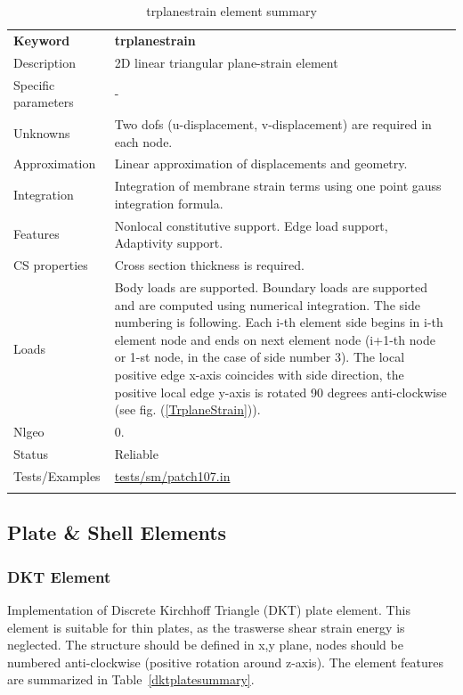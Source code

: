 \documentclass[a4paper]{article}
\newcommand{\param}[1]{\texttt{#1}} %
\newcommand{\templabel}{}%
\newcommand{\tempcaption}{}%
\newcounter{nelpar}
\newenvironment{elementsummary}[5]{%
  \gdef\tempcaption{#4}%
  \gdef\templabel{#5}%
  \setcounter{nelpar}{0}%
  \begin{center} %
    \begin{table}[!htb] %
      \begin{tabular}{|l|p{9cm}|}\hline %
        {\bf Keyword} & \bf{#1}\\ %
        {Description} & {#2}\\ %
        {Specific parameters} & {#3}\\ \hline %
}{
  \\ \hline %
      \end{tabular}%
      \caption{\tempcaption}%
      \label{\templabel}%
    \end{table}%
  \end{center}%
}
\newcommand{\elementParam}[1]{%
  \ifthenelse{\value{nelpar}>0} %
             {&{#1}}%
             {\setcounter{nelpar}{1}Parameters&{#1}}%
             \\%
}
\newcommand{\elementDescription}[2]{{#1} & {#2}\\}
\begin{document}
\begin{elementsummary}{trplanestrain}{2D linear triangular plane-strain element}{-}{trplanestrain element summary}{trplanestrainsummary}
\elementDescription{Unknowns}{Two dofs (u-displacement, v-displacement) are required in each node.}
\elementDescription{Approximation}{Linear approximation of displacements and geometry.}
\elementDescription{Integration}{Integration of membrane strain terms using one point gauss integration formula.}
\elementDescription{Features}{Nonlocal constitutive support. Edge load support, Adaptivity support.}
\elementDescription{CS properties}{Cross section thickness is required.}
\elementDescription{Loads}{Body loads are supported. Boundary loads are supported and are computed  using numerical integration. The side numbering is following.
Each i-th element side begins in i-th element node and ends on next element node (i+1-th node or 1-st node, in the case of side number 3).
The local positive edge x-axis coincides with side direction, the positive local edge y-axis is rotated 90 degrees anti-clockwise (see fig. (\ref{TrplaneStrain})).}
\elementDescription{Nlgeo}{0.}
\elementDescription{Status}{Reliable}
\elementDescription{Tests/Examples}{\href{https://github.com/oofem/oofem/blob/devel/tests/sm/patch107.in}{tests/sm/patch107.in}}
\end{elementsummary}




\clearpage
\subsection{Plate \& Shell Elements}


\subsubsection {DKT Element}
\label{dkt}
Implementation of Discrete Kirchhoff Triangle (DKT) plate element.
This element is suitable for thin plates, as the traswerse shear strain energy is neglected.
The structure should be defined in x,y plane, nodes should be numbered anti-clockwise (positive rotation around
z-axis). The element features are summarized in Table~\ref{dktplatesummary}.
\end{document}
